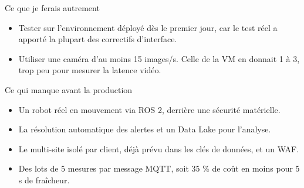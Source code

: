 \documentclass[9pt,a4paper]{extarticle}
\begin{document}

\noindent\begin{minipage}[t]{0.485\linewidth}\vspace{0pt}
  \fontsize{8.5}{10.3}\selectfont
  {\mediumfont Ce que je ferais autrement}\par\vspace{0.6mm}
  \begin{itemize}
    \item Tester sur l'environnement déployé dès le premier jour, car le test réel a apporté la plupart des correctifs d'interface.
    \item Utiliser une caméra d'au moins 15 images/s. Celle de la VM en donnait 1 à 3, trop peu pour mesurer la latence vidéo.
  \end{itemize}
\end{minipage}\hfill
\begin{minipage}[t]{0.485\linewidth}\vspace{0pt}
  \fontsize{8.5}{10.3}\selectfont
  {\mediumfont Ce qui manque avant la production}\par\vspace{0.6mm}
  \begin{itemize}
    \item Un robot réel en mouvement via ROS 2, derrière une sécurité matérielle.
    \item La résolution automatique des alertes et un Data Lake pour l'analyse.
    \item Le multi-site isolé par client, déjà prévu dans les clés de données, et un WAF.
    \item Des lots de 5 mesures par message MQTT, soit 35 \% de coût en moins pour 5 s de fraîcheur.
  \end{itemize}
\end{minipage}
\end{document}
